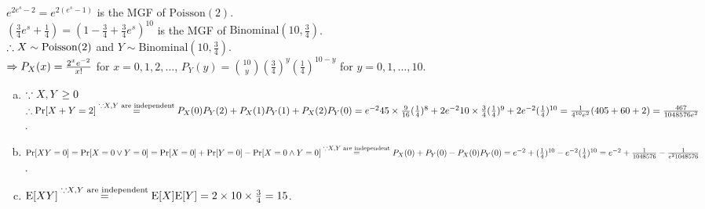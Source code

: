\begin{pr}
$e^{2e^s-2}=e^{2(e^s-1)}$ is the MGF of $\mathrm{Poisson}(2)$.\\
$(\frac34e^s+\frac14)=(1-\frac34+\frac34e^s)^{10}$ is the MGF of $\mathrm{Binominal}(10, \frac34)$.\\
$\therefore X\sim\mathrm{Poisson}(2)$ and $Y\sim\mathrm{Binominal}(10, \frac34)$.\\
$\Rightarrow P_X(x)=\frac{2^xe^{-2}}{x!}$ for $x=0, 1, 2, \dots$, $P_Y(y)=\binom{10}y(\frac34)^y(\frac14)^{10-y}$ for $y=0, 1, \dots, 10$.
\begin{enumerate}[(a)]
\item $\because X, Y\geq0$\\
$\therefore\mathrm{Pr}[X+Y=2]\overset{\because X, Y\text{ are independent}}=P_X(0)P_Y(2)+P_X(1)P_Y(1)+P_X(2)P_Y(0)=e^{-2}45\times\frac9{16}(\frac14)^8+2e^{-2}10\times\frac34(\frac14)^9+2e^{-2}(\frac14)^{10}=\frac1{4^{10}e^2}(405+60+2)=\frac{467}{1048576e^2}$.
\item $\mathrm{Pr}[XY=0]=\mathrm{Pr}[X=0\lor Y=0]=\mathrm{Pr}[X=0]+\mathrm{Pr}[Y=0]-\mathrm{Pr}[X=0\land Y=0]\overset{\because X, Y\text{ are independent}}=P_X(0)+P_Y(0)-P_X(0)P_Y(0)=e^{-2}+(\frac14)^{10}-e^{-2}(\frac14)^{10}=e^{-2}+\frac1{1048576}-\frac1{e^21048576}$.
\item $\mathrm{E}[XY]\overset{\because X, Y\text{ are independent}}=\mathrm{E}[X]\mathrm{E}[Y]=2\times10\times\frac34=15$.
\end{enumerate}
\end{pr}
